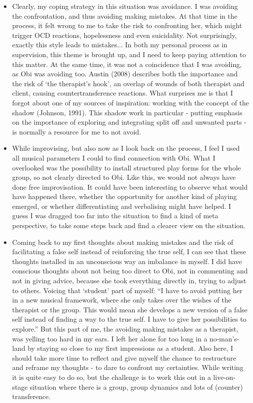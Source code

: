 \documentclass[authordate, empirical, issue]{jote-new-article}
\begin{document}
\begin{itemize}
  \item Clearly, my coping strategy in this situation was avoidance. I was avoiding the confrontation, and thus avoiding making mistakes. At that time in the process, it felt wrong to me to take the risk to confronting her, which might trigger OCD reactions, hopelessness and even suicidality. Not surprisingly, exactly this style leads to mistakes... In both my personal process as in supervision, this theme is brought up, and I need to keep paying attention to this matter. At the same time, it was not a coincidence that I was avoiding, as Obi was avoiding too. Austin (2008) describes both the importance and the risk of ‘the therapist's hook', an overlap of wounds of both therapist and client, causing countertransference reactions. What surprises me is that I forgot about one of my sources of inspiration: working with the concept of the shadow (Johnson, 1991). This shadow work in particular - putting emphasis on the importance of exploring and integrating split off and unwanted parts - is normally a resource for me to not avoid.



  \item
        While improvising, but also now as I look back on the process, I feel I used all musical parameters I could to find connection with Obi. What I overlooked was the possibility to install structured play forms for the whole group, so not clearly directed to Obi. Like this, we would not always have done free improvisation. It could have been interesting to observe what would have happened there, whether the opportunity for another kind of playing emerged, or whether differentiating and verbalising might have helped. I guess I was dragged too far into the situation to find a kind of meta perspective, to take some steps back and find a clearer view on the situation.



  \item Coming back to my first thoughts about making mistakes and the risk of facilitating a false self instead of reinforcing the true self, I can see that these thoughts installed in an unconscious way an imbalance in myself. I did have conscious thoughts about not being too direct to Obi, not in commenting and not in giving advice, because she took everything directly in, trying to adjust to others. Voicing that ‘student' part of myself: “I have to avoid putting her in a new musical framework, where she only takes over the wishes of the therapist or the group. This would mean she develops a new version of a false self instead of finding a way to the true self. I have to give her possibilities to explore.” But this part of me, the avoiding making mistakes as a therapist, was yelling too hard in my ears. I left her alone for too long in a no-man's-land by staying so close to my first impressions as a student. Also here, I should take more time to reflect and give myself the chance to restructure and reframe my thoughts - to dare to confront my certainties. While writing it is quite easy to do so, but the challenge is to work this out in a live-on-stage situation where there is a group, group dynamics and lots of (counter) transference.



\end{itemize}
\end{document}

